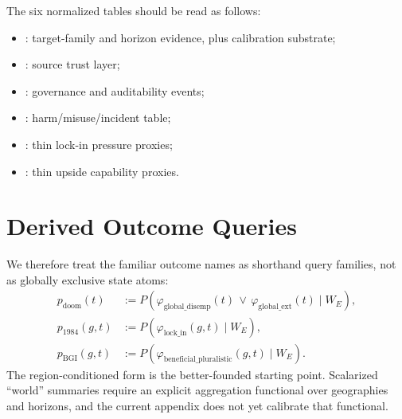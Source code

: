 \documentclass[11pt,openany]{report}
\begin{document}
\begin{table}[htbp]
\centering
\caption{Factor families directly supported by the current normalized
advanced-AI appendix bundle.}
\label{tab:ai-outcomes-factor-support}
\end{table}

The six normalized tables should be read as follows:
\begin{itemize}
\item {}: target-family and horizon evidence,
  plus calibration substrate;
\item {}: source trust layer;
\item {}: governance and
  auditability events;
\item {}: harm/misuse/incident table;
\item {}: thin lock-in pressure proxies;
\item {}: thin upside capability proxies.
\end{itemize}

\section{Derived Outcome Queries}

We therefore treat the familiar outcome names as shorthand query
families, not as globally exclusive state atoms:
\begin{align*}
  p_{\mathrm{doom}}(t) &:= P(\varphi_{\mathrm{global\_disemp}}(t)
    \,\lor\, \varphi_{\mathrm{global\_ext}}(t) \mid W_E),\\
  p_{1984}(g,t) &:= P(\varphi_{\mathrm{lock\_in}}(g,t) \mid W_E),\\
  p_{\mathrm{BGI}}(g,t) &:= P(\varphi_{\mathrm{beneficial\_pluralistic}}(g,t)
    \mid W_E).
\end{align*}
The region-conditioned form is the better-founded starting point.
Scalarized ``world'' summaries require an explicit aggregation functional
over geographies and horizons, and the current appendix does not yet
calibrate that functional.
\end{document}

